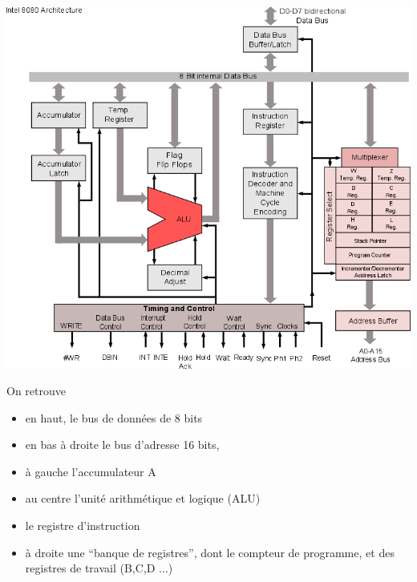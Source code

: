 \begin{center}
\includegraphics[width=\linewidth]{Historique/8080.png}
\end{center}

On retrouve 
\begin{itemize}
\item en haut, le bus de données de 8 bits
\item en bas à droite le bus d'adresse 16 bits,
\item à gauche l'accumulateur A
\item au centre l'unité arithmétique et logique (ALU)
\item le registre d'instruction
\item à droite une ``banque de registres'', dont le compteur de programme,
et des registres de travail (B,C,D ...)
\end{itemize}

